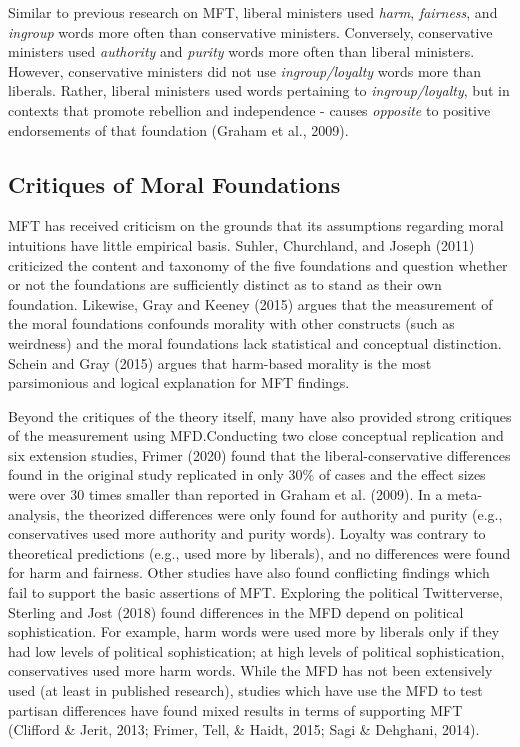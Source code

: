 \documentclass[
  english,
  man,floatsintext]{apa6}
\begin{document}
Similar to previous research on MFT, liberal ministers used \emph{harm}, \emph{fairness}, and \emph{ingroup} words more often than conservative ministers. Conversely, conservative ministers used \emph{authority} and \emph{purity} words more often than liberal ministers. However, conservative ministers did not use \emph{ingroup/loyalty} words more than liberals. Rather, liberal ministers used words pertaining to \emph{ingroup/loyalty}, but in contexts that promote rebellion and independence - causes \emph{opposite} to positive endorsements of that foundation (Graham et al., 2009).

\hypertarget{critiques-of-moral-foundations}{%
\subsection{Critiques of Moral Foundations}\label{critiques-of-moral-foundations}}

MFT has received criticism on the grounds that its assumptions regarding moral intuitions have little empirical basis. Suhler, Churchland, and Joseph (2011) criticized the content and taxonomy of the five foundations and question whether or not the foundations are sufficiently distinct as to stand as their own foundation. Likewise, Gray and Keeney (2015) argues that the measurement of the moral foundations confounds morality with other constructs (such as weirdness) and the moral foundations lack statistical and conceptual distinction. Schein and Gray (2015) argues that harm-based morality is the most parsimonious and logical explanation for MFT findings.

Beyond the critiques of the theory itself, many have also provided strong critiques of the measurement using MFD.Conducting two close conceptual replication and six extension studies, Frimer (2020) found that the liberal-conservative differences found in the original study replicated in only 30\% of cases and the effect sizes were over 30 times smaller than reported in Graham et al. (2009). In a meta-analysis, the theorized differences were only found for authority and purity (e.g., conservatives used more authority and purity words). Loyalty was contrary to theoretical predictions (e.g., used more by liberals), and no differences were found for harm and fairness. Other studies have also found conflicting findings which fail to support the basic assertions of MFT. Exploring the political Twitterverse, Sterling and Jost (2018) found differences in the MFD depend on political sophistication. For example, harm words were used more by liberals only if they had low levels of political sophistication; at high levels of political sophistication, conservatives used more harm words. While the MFD has not been extensively used (at least in published research), studies which have use the MFD to test partisan differences have found mixed results in terms of supporting MFT (Clifford \& Jerit, 2013; Frimer, Tell, \& Haidt, 2015; Sagi \& Dehghani, 2014).
\end{document}

